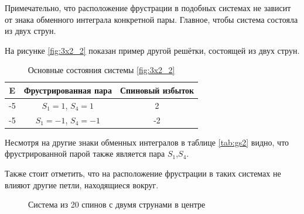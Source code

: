 \documentclass[utf8, babel, sor, jor, amsmath, amssymb, reprint]{elsarticle} %
\begin{document}
Примечательно, что расположение фрустрации в подобных системах не зависит от знака обменного интеграла конкретной пары. Главное, чтобы система состояла из двух струн.


На рисунке \eqref{fig:3x2_2} показан пример другой решётки, состоящей из двух струн.

\begin{table}[h]
	\centering
	\begin{tabular}{|c|c|c|}
		\hline
		E   &   Фрустрированная пара & Спиновый избыток \\
		\hline
		-5   &  $S_1=1$, $S_4=1$ & 2 \\
		\hline
		-5   &   $S_1=-1$, $S_4=-1$ & -2 \\
		\hline
	\end{tabular}
	\caption{Основные состояния системы \eqref{fig:3x2_2}}
	\label{tab:gs2}
\end{table}

Несмотря на другие знаки обменных интегралов в таблице \eqref{tab:gs2} видно, что фрустрированной парой также является пара $S_1$,$S_4$.

Также стоит отметить, что на расположение фрустрации в таких системах  не влияют другие петли, находящиеся вокруг.

\begin{figure}[h]
	\centering
	\caption{Система из 20 спинов с двумя струнами в центре}
	\label{fig:5x4}
\end{figure}
\end{document}
